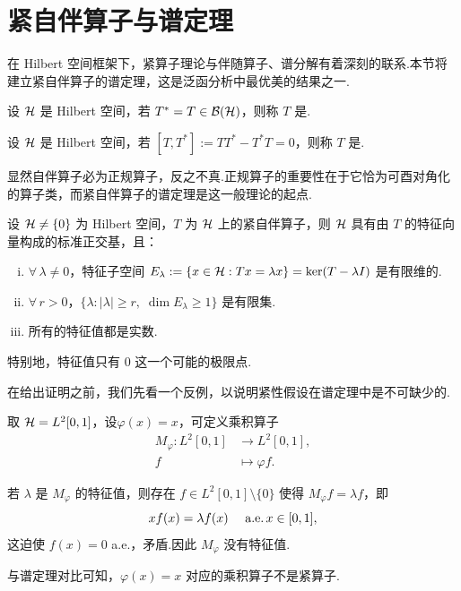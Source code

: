 \section{紧自伴算子与谱定理}

在 Hilbert 空间框架下，紧算子理论与伴随算子、谱分解有着深刻的联系.本节将建立紧自伴算子的谱定理，这是泛函分析中最优美的结果之一.

\begin{definition}[自伴算子]
设 $\mathcal{H}$ 是 Hilbert 空间，若 $T^* = T\in\mathcal{B}(\mathcal{H})$，则称 $T$ 是.
\end{definition}

\begin{definition}[正规算子]
设 $\mathcal{H}$ 是 Hilbert 空间，若 $[T, T^*] := TT^* - T^*T = 0$，则称 $T$ 是.
\end{definition}

显然自伴算子必为正规算子，反之不真.正规算子的重要性在于它恰为可酉对角化的算子类，而紧自伴算子的谱定理是这一般理论的起点.

\begin{theorem}[紧自伴算子的谱定理]
设 $\mathcal{H}\neq\{0\}$ 为 Hilbert 空间，$T$ 为 $\mathcal{H}$ 上的紧自伴算子，则 $\mathcal{H}$ 具有由 $T$ 的特征向量构成的标准正交基，且：
\begin{enumerate}[(i)]
    \item $\forall\,\lambda\neq0$，特征子空间 $E_\lambda:=\{x\in\mathcal{H}: Tx = \lambda x\} = \ker(T - \lambda I)$ 是有限维的.
    \item $\forall\,r>0$，$\{\lambda: |\lambda|\geq r,\; \dim E_\lambda\geq 1\}$ 是有限集.
    \item 所有的特征值都是实数.
\end{enumerate}
特别地，特征值只有 $0$ 这一个可能的极限点.
\end{theorem}

在给出证明之前，我们先看一个反例，以说明紧性假设在谱定理中是不可缺少的.

\begin{instance}[乘积算子不是紧算子]
取 $\mathcal{H} = L^2[0,1]$，设$\varphi(x)=x$，可定义乘积算子
\begin{align*}
M_\varphi: L^2[0,1] &\to L^2[0,1],\\[-6pt]
f &\mapsto \varphi f.
\end{align*}

若 $\lambda$ 是 $M_\varphi$ 的特征值，则存在 $f\in L^2[0,1]\setminus\{0\}$ 使得 $M_\varphi f = \lambda f$，即
\begin{equation*}
xf(x) = \lambda f(x)\quad \operatorname{\,\text{a.e.}} x\in[0,1],
\end{equation*}
这迫使 $f(x)=0$ a.e.，矛盾.因此 $M_\varphi$ 没有特征值.\par
与谱定理对比可知，$\varphi(x)=x$ 对应的乘积算子不是紧算子.
\end{instance}

